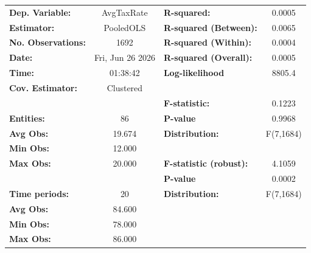\begin{center}
\begin{tabular}{lclc}
\toprule
\textbf{Dep. Variable:}                       &     AvgTaxRate     & \textbf{  R-squared:         }   &      0.0005      \\
\textbf{Estimator:}                           &     PooledOLS      & \textbf{  R-squared (Between):}  &      0.0065      \\
\textbf{No. Observations:}                    &        1692        & \textbf{  R-squared (Within):}   &      0.0004      \\
\textbf{Date:}                                &  Fri, Jun 26 2026  & \textbf{  R-squared (Overall):}  &      0.0005      \\
\textbf{Time:}                                &      01:38:42      & \textbf{  Log-likelihood     }   &      8805.4      \\
\textbf{Cov. Estimator:}                      &     Clustered      & \textbf{                     }   &                  \\
\textbf{}                                     &                    & \textbf{  F-statistic:       }   &      0.1223      \\
\textbf{Entities:}                            &         86         & \textbf{  P-value            }   &      0.9968      \\
\textbf{Avg Obs:}                             &       19.674       & \textbf{  Distribution:      }   &    F(7,1684)     \\
\textbf{Min Obs:}                             &       12.000       & \textbf{                     }   &                  \\
\textbf{Max Obs:}                             &       20.000       & \textbf{  F-statistic (robust):} &      4.1059      \\
\textbf{}                                     &                    & \textbf{  P-value            }   &      0.0002      \\
\textbf{Time periods:}                        &         20         & \textbf{  Distribution:      }   &    F(7,1684)     \\
\textbf{Avg Obs:}                             &       84.600       & \textbf{                     }   &                  \\
\textbf{Min Obs:}                             &       78.000       & \textbf{                     }   &                  \\
\textbf{Max Obs:}                             &       86.000       & \textbf{                     }   &                  \\

\end{tabular}
\end{center}
